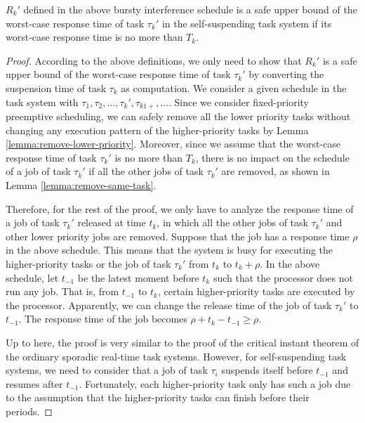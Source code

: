 \begin{lemma}
\label{lemma:critical}
 $R_k'$ defined in the above bursty interference schedule is a safe upper bound of the worst-case response time of task $\tau_k'$ in the self-suspending task system if its worst-case response time is no more than $T_k$.
\end{lemma}
\begin{proof}
According to the above definitions, we only need to show that $R_k'$ is a safe upper bound of the worst-case response time of task $\tau_k'$ by converting the suspension time of task $\tau_k$ as computation. We consider a given schedule in the task system with $\tau_1, \tau_2, \ldots, \tau_k', \tau_{k1+}, \ldots$. Since we consider fixed-priority preemptive scheduling, we can safely remove all the lower priority tasks without changing any execution pattern of the higher-priority tasks by Lemma \ref{lemma:remove-lower-priority}. Moreover, since we assume that the worst-case response time of task $\tau_k'$ is no more than $T_k$, there is no impact on the schedule of a job of task $\tau_k'$ if all the other jobs of task $\tau_k'$ are removed, as shown in Lemma \ref{lemma:remove-same-task}. 


Therefore, for the rest of the proof, we only have to analyze the response time of a job of task $\tau_k'$ released at time $t_k$, in which all the other jobs of task $\tau_k'$ and other lower priority jobs are removed. Suppose that the job has a response time $\rho$ in the above schedule. This means that the system is busy for executing the higher-priority tasks or the job of task $\tau_k'$ from $t_k$ to $t_k+\rho$. In the above schedule, let $t_{-1}$ be the latest moment before $t_k$ such that the processor does not run any job. That is, from $t_{-1}$ to $t_k$, certain higher-priority tasks are executed by the processor. Apparently, we can change the release time of the job of task $\tau_k'$ to $t_{-1}$. The response time of the job becomes $\rho+t_k-t_{-1} \geq \rho$. 

Up to here, the proof is very similar to the proof of the critical instant theorem of the ordinary sporadic real-time task systems. However, for self-suspending task systems, we need to consider that a job of task $\tau_i$ suspends itself before $t_{-1}$ and resumes after $t_{-1}$.  Fortunately, each higher-priority task only has such a job due to the assumption that the higher-priority tasks can finish before their periods. 


\end{proof}
  
  

  
  
  
  
  
  
  
  
  
  
  